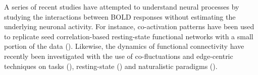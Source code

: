 A series of recent studies have attempted to understand neural processes by studying the interactions between BOLD responses without estimating the underlying neuronal activity. For instance, co-activation patterns have been used to replicate seed correlation-based resting-state functional networks with a small portion of the data (\citealt{liu2013time,liu2013decomposition,liu2018co,majeed2009spatiotemporal,majeed2011spatiotemporal,cifre2020revisiting,cifre2020further,zhang2020relationship}). Likewise, the dynamics of functional connectivity have recently been investigated with the use of co-fluctuations and edge-centric techniques on tasks (\citealt{faskowitz2021EdgecentricModelHarmonizing}), resting-state (\citealt{zamaniesfahlani2020HighamplitudeCofluctuationsCortical}) and naturalistic paradigms (\citealt{faskowitz2020EdgecentricFunctionalNetwork,betzel2020TemporalFluctuationsBrain}). %